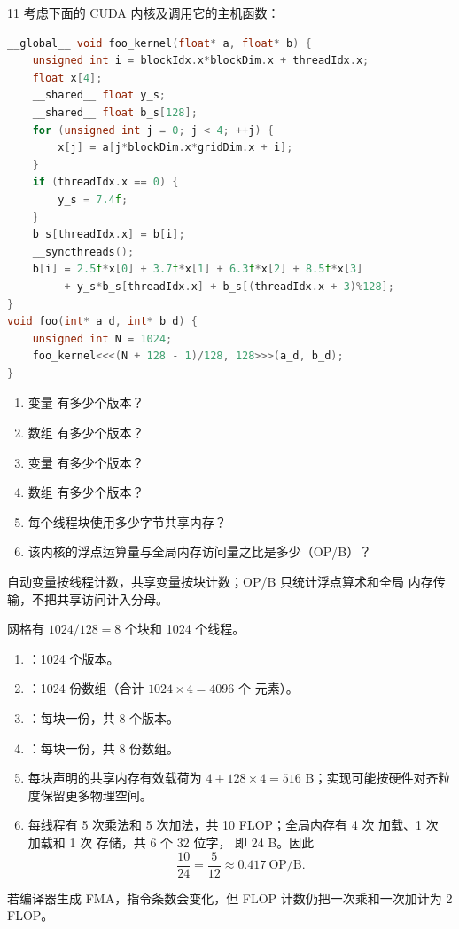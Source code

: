 \begin{solutionexercise}{11}
\problemheading 考虑下面的 CUDA 内核及调用它的主机函数：
\begin{lstlisting}[language=C++,firstnumber=1]
__global__ void foo_kernel(float* a, float* b) {
    unsigned int i = blockIdx.x*blockDim.x + threadIdx.x;
    float x[4];
    __shared__ float y_s;
    __shared__ float b_s[128];
    for (unsigned int j = 0; j < 4; ++j) {
        x[j] = a[j*blockDim.x*gridDim.x + i];
    }
    if (threadIdx.x == 0) {
        y_s = 7.4f;
    }
    b_s[threadIdx.x] = b[i];
    __syncthreads();
    b[i] = 2.5f*x[0] + 3.7f*x[1] + 6.3f*x[2] + 8.5f*x[3]
         + y_s*b_s[threadIdx.x] + b_s[(threadIdx.x + 3)%128];
}
void foo(int* a_d, int* b_d) {
    unsigned int N = 1024;
    foo_kernel<<<(N + 128 - 1)/128, 128>>>(a_d, b_d);
}
\end{lstlisting}
\begin{enumerate}[label=\alph*.,leftmargin=2.2em]
  \item 变量  有多少个版本？
  \item 数组  有多少个版本？
  \item 变量  有多少个版本？
  \item 数组  有多少个版本？
  \item 每个线程块使用多少字节共享内存？
  \item 该内核的浮点运算量与全局内存访问量之比是多少（OP/B）？
\end{enumerate}
\approachheading 自动变量按线程计数，共享变量按块计数；OP/B 只统计浮点算术和全局
内存传输，不把共享访问计入分母。

\answerheading 网格有 $1024/128=8$ 个块和 1024 个线程。
\begin{enumerate}[label=\alph*.,leftmargin=2.2em]
\item {}：1024 个版本。
\item {}：1024 份数组（合计 $1024\times4=4096$ 个  元素）。
\item {}：每块一份，共 8 个版本。
\item {}：每块一份，共 8 份数组。
\item 每块声明的共享内存有效载荷为
$4+128\times4=516$ B；实现可能按硬件对齐粒度保留更多物理空间。
\item 每线程有 5 次乘法和 5 次加法，共 10 FLOP；全局内存有 4 次
 加载、1 次  加载和 1 次  存储，共 6 个 32 位字，
即 24 B。因此
\[
\frac{10}{24}=\frac5{12}\approx0.417\ \mathrm{OP/B}.
\]
\end{enumerate}
若编译器生成 FMA，指令条数会变化，但 FLOP 计数仍把一次乘和一次加计为 2 FLOP。


\end{solutionexercise}
